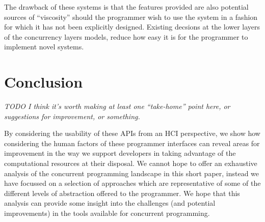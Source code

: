 \documentclass{sig-alternate}
\begin{document}
The drawback of these systems is that the features provided are also
potential sources of ``viscosity'' should the programmer wish to use
the system in a fashion for which it has not been explicitly designed.
Existing decsions at the lower layers of the concurrency layers
models, reduce how easy it is for the programmer to implement novel
systems.

\section{Conclusion}

\emph{TODO I think it's worth making at least one ``take-home'' point
  here, or suggestions for improvement, or something.}

By considering the usability of these APIs from an HCI perspective, we
show how considering the human factors of these programmer interfaces
can reveal areas for improvement in the way we support developers in
taking advantage of the computational resources at their disposal. We
cannot hope to offer an exhaustive analysis of the concurrent
programming landscape in this short paper, instead we have focussed on
a selection of approaches which are representative of some of the
different levels of abstraction offered to the programmer. We hope
that this analysis can provide some insight into the challenges (and
potential improvements) in the tools available for concurrent
programming.



\end{document}
